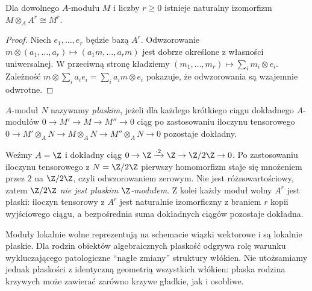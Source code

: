 \begin{stwierdzenie}
Dla dowolnego $A$-modułu $M$ i liczby $r\ge0$
istnieje naturalny izomorfizm
$M\otimes_A A^r\cong M^r$.
\end{stwierdzenie}
\begin{proof}
Niech $e_1,\ldots,e_r$ będzie bazą $A^r$.
Odwzorowanie $m\otimes(a_1,\ldots,a_r)
\mapsto(a_1m,\ldots,a_rm)$ jest dobrze określone
z własności uniwersalnej. W przeciwną stronę
kładziemy $(m_1,\ldots,m_r)\mapsto
\sum_i m_i\otimes e_i$. Zależność
$m\otimes\sum_i a_i e_i=\sum_i a_i m\otimes e_i$
pokazuje, że odwzorowania są wzajemnie odwrotne.
\end{proof}

\begin{definicja}
$A$-moduł $N$ nazywamy \emph{płaskim},
jeżeli dla każdego krótkiego ciągu dokładnego
$A$-modułów $0\to M'\to M\to M''\to0$
ciąg po zastosowaniu iloczynu tensorowego
$0\to M'\otimes_A N\to M\otimes_A N
\to M''\otimes_A N\to0$ pozostaje dokładny.
\end{definicja}

\begin{przyklad}
Weźmy $A=\Z$ i dokładny ciąg
$0\to\Z\xrightarrow{\cdot2}\Z\to\Z/2\Z\to0$.
Po zastosowaniu iloczynu tensorowego z $N=\Z/2\Z$ pierwszy
homomorfizm staje się mnożeniem przez $2$
na $\Z/2\Z$, czyli odwzorowaniem zerowym.
Nie jest różnowartościowy, zatem $\Z/2\Z$
\emph{nie jest płaskim $\Z$-modułem}.
Z kolei każdy moduł wolny $A^r$ jest płaski:
iloczyn tensorowy z $A^r$ jest naturalnie izomorficzny
z braniem $r$ kopii wyjściowego ciągu,
a bezpośrednia suma dokładnych ciągów pozostaje
dokładna.
\end{przyklad}

\begin{uwaga}
Moduły lokalnie wolne reprezentują na schemacie
wiązki wektorowe i są lokalnie płaskie.
Dla rodzin obiektów algebraicznych płaskość
odgrywa rolę warunku wykluczającego patologiczne
``nagłe zmiany'' struktury włókien. Nie utożsamiamy
jednak płaskości z identyczną geometrią wszystkich
włókien: płaska rodzina krzywych może zawierać
zarówno krzywe gładkie, jak i osobliwe.
\end{uwaga}


